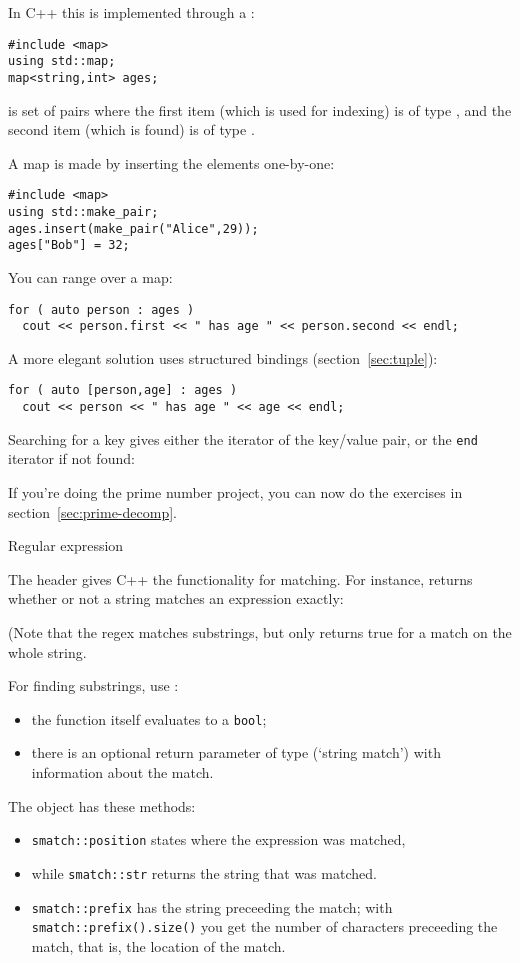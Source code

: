 In C++ this is implemented through a :
\begin{lstlisting}
#include <map>
using std::map;
map<string,int> ages;
\end{lstlisting}
is set of
pairs where the first item (which is used for indexing) is of type
, and the second item (which is found) is of type .

A map is made by inserting the elements one-by-one:
\begin{lstlisting}
#include <map>
using std::make_pair;
ages.insert(make_pair("Alice",29));
ages["Bob"] = 32;
\end{lstlisting}

You can range over a map:
\begin{lstlisting}
for ( auto person : ages )
  cout << person.first << " has age " << person.second << endl;
\end{lstlisting}
A more elegant solution uses structured bindings (section~\ref{sec:tuple}):
\begin{lstlisting}
for ( auto [person,age] : ages )
  cout << person << " has age " << age << endl;
\end{lstlisting}

Searching for a key gives either the iterator of the key/value pair,
or the \lstinline{end} iterator if not found:
%

\begin{exercise}
  If you're doing the prime number project, you can now do
  the exercises in section~\ref{sec:prime-decomp}.
\end{exercise}

 {Regular expression}

The header  gives C++ the functionality for
 matching. For instance,
 returns whether or not
a string matches an expression exactly:


(Note that the regex matches substrings, but
 only returns true for
a match on the whole string.

For finding substrings, use :
\begin{itemize}
\item the function itself evaluates to a \lstinline{bool};
\item there is an optional return parameter of type 
  (`string match') with information about the match.
\end{itemize}
The  object has these methods:
\begin{itemize}
\item \lstinline{smatch::position} states where the expression
  was matched,
\item while \lstinline{smatch::str} returns the string that
  was matched.
\item \lstinline{smatch::prefix} has the string preceeding the match;
  with \lstinline{smatch::prefix().size()} you get the number of characters
  preceeding the match, that is, the location of the match.
\end{itemize}

